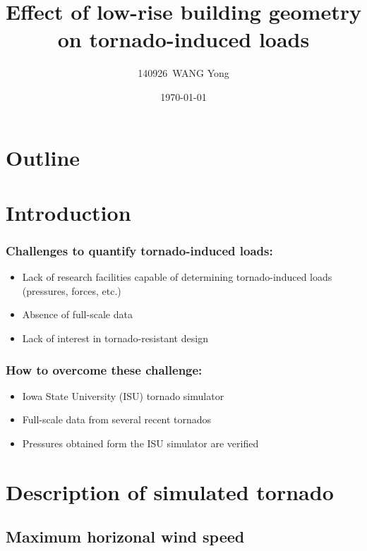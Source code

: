 \documentclass{beamer}
\title{Effect of low-rise building geometry on tornado-induced loads}
\author{140926~WANG Yong}
\institute{Southeast University}
\date{\today}
\begin{document}
\begin{frame}
	\titlepage
\end{frame}

\section*{Outline}
\begin{frame}
	\tableofcontents
\end{frame}

\section{Introduction}

\begin{frame}
    \frametitle{Challenges to quantify  tornado-induced loads:}
    \begin{itemize}
    	\item<1-> Lack of research facilities capable of determining tornado-induced loads (pressures, forces, etc.)
    	\item<2-> Absence of full-scale data
    	\item<3-> Lack of interest in tornado-resistant design
    \end{itemize}
\end{frame}

\begin{frame}
    \frametitle{How to overcome these challenge:}
    \begin{itemize}
    	\item<1-> Iowa State University (ISU) tornado simulator
    	\item<2-> Full-scale data from several recent tornados
    	\item<3-> Pressures obtained form  the ISU simulator are verified
    \end{itemize}
\end{frame}


\section{Description of simulated tornado}
\subsection{Maximum horizonal wind speed}
\end{document}
